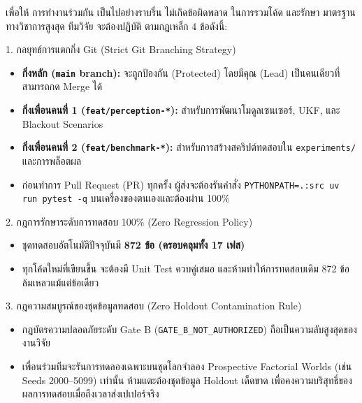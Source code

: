 \documentclass[10pt,a4paper]{article}
\begin{document}
เพื่อให้ การทำงานร่วมกัน เป็นไปอย่างราบรื่น ไม่เกิดข้อผิดพลาด ในการรวมโค้ด และรักษา มาตรฐานทางวิชาการสูงสุด ทีมวิจัย จะต้องปฏิบัติ ตามกฎเหล็ก 4 ข้อดังนี้:

\vspace{4pt}
\begin{infobox}{1. กลยุทธ์การแตกกิ่ง Git (Strict Git Branching Strategy)}
  \begin{itemize}[leftmargin=12pt, itemsep=1.5pt, topsep=1pt, parsep=0pt]
    \item \textbf{กิ่งหลัก (\texttt{main} branch):} จะถูกป้องกัน (Protected) โดยมีคุณ (Lead) เป็นคนเดียวที่สามารถกด Merge ได้
    \item \textbf{กิ่งเพื่อนคนที่ 1 (\texttt{feat/perception-*}):} สำหรับการพัฒนาโมดูลเซนเซอร์, UKF, และ Blackout Scenarios
    \item \textbf{กิ่งเพื่อนคนที่ 2 (\texttt{feat/benchmark-*}):} สำหรับการสร้างสคริปต์ทดสอบใน \texttt{experiments/} และการพล็อตผล
    \item ก่อนทำการ Pull Request (PR) ทุกครั้ง ผู้ส่งจะต้องรันคำสั่ง \texttt{PYTHONPATH=.:src uv run pytest -q} บนเครื่องของตนเองและต้องผ่าน 100\%
  \end{itemize}
\end{infobox}

\vspace{3pt}
\begin{infobox}{2. กฎการรักษาระดับการทดสอบ 100\% (Zero Regression Policy)}
  \begin{itemize}[leftmargin=12pt, itemsep=1.5pt, topsep=1pt, parsep=0pt]
    \item ชุดทดสอบอัตโนมัติปัจจุบันมี \textbf{872 ข้อ (ครอบคลุมทั้ง 17 เฟส)}
    \item ทุกโค้ดใหม่ที่เขียนขึ้น จะต้องมี Unit Test ควบคู่เสมอ และห้ามทำให้การทดสอบเดิม 872 ข้อล้มเหลวแม้แต่ข้อเดียว
  \end{itemize}
\end{infobox}

\vspace{3pt}
\begin{infobox}{3. กฎความสมบูรณ์ของชุดข้อมูลทดสอบ (Zero Holdout Contamination Rule)}
  \begin{itemize}[leftmargin=12pt, itemsep=1.5pt, topsep=1pt, parsep=0pt]
    \item กฎบัตรความปลอดภัยระดับ Gate B (\texttt{GATE\_B\_NOT\_AUTHORIZED}) ถือเป็นความลับสูงสุดของงานวิจัย
    \item เพื่อนร่วมทีมจะรันการทดลองเฉพาะบนชุดโลกจำลอง Prospective Factorial Worlds (เช่น Seeds 2000–5099) เท่านั้น ห้ามแตะต้องชุดข้อมูล Holdout เด็ดขาด เพื่อคงความบริสุทธิ์ของผลการทดสอบเมื่อถึงเวลาส่งเปเปอร์จริง
  \end{itemize}
\end{infobox}
\end{document}

